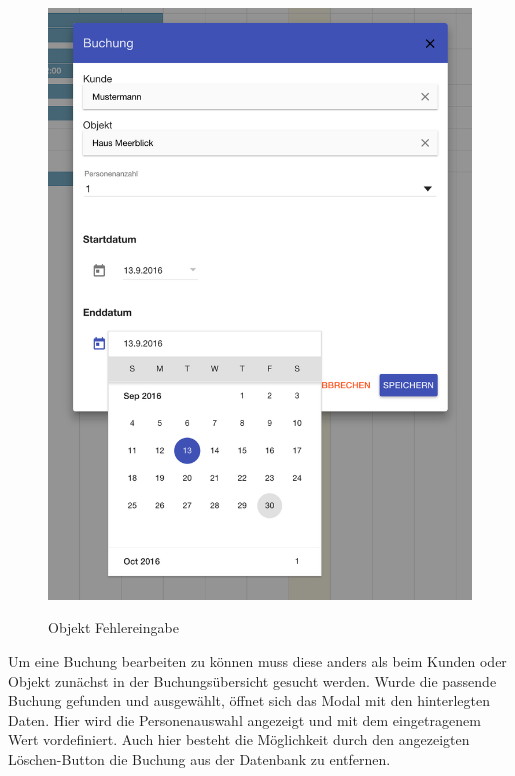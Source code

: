 \begin{figure}[H]
\begin{minipage}[t]{0.49\linewidth}
        \includegraphics[width=\linewidth]{images/frontend_booking_calender.png}
        \label{frontend_booking_calender}
        \caption{Objekt Fehlereingabe}
    \end{minipage}
\end{figure}

Um eine Buchung bearbeiten zu können muss diese anders als beim Kunden oder Objekt zunächst in der Buchungsübersicht gesucht werden. Wurde die passende Buchung gefunden und ausgewählt, öffnet sich das Modal mit den hinterlegten Daten. Hier wird die Personenauswahl angezeigt und mit dem eingetragenem Wert vordefiniert. Auch hier besteht die Möglichkeit durch den angezeigten Löschen-Button die Buchung aus der Datenbank zu entfernen.  

